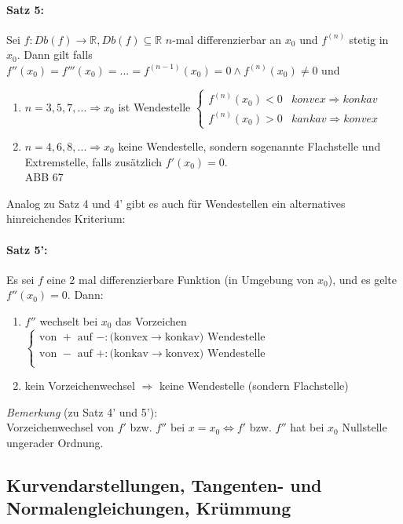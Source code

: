 \paragraph{Satz 5:} Sei $f: Db(f) \to \mathbb{R}, Db(f) \subseteq \mathbb{R}$ $n$-mal differenzierbar an $x_0$ und $f^{(n)}$ stetig in $x_0$. Dann gilt falls $f''(x_0)=f'''(x_0)=...=f^{(n-1)}(x_0)=0 \wedge f^{(n)}(x_0)\not = 0$ und
\begin{enumerate}[label=\alph*.)]
\item $n=3,5,7,... \Rightarrow x_0$ ist Wendestelle $\begin{cases}
f^{(n)}(x_0)<0 & konvex \Rightarrow konkav\\
f^{(n)}(x_0)>0 & kankav \Rightarrow konvex
\end{cases}$
\item $n=4,6,8,... \Rightarrow x_0$ keine Wendestelle, sondern sogenannte Flachstelle und Extremstelle, falls zusätzlich $f'(x_0) = 0$.\\
ABB 67
\end{enumerate}
Analog zu Satz 4 und 4' gibt es auch für Wendestellen ein alternatives hinreichendes Kriterium:
\paragraph{Satz 5':} Es sei $f$ eine 2 mal differenzierbare Funktion (in Umgebung von $x_0$), und es gelte $f''(x_0)=0$. Dann:
\begin{enumerate}[label=\alph*.)]
\item $f''$ wechselt bei $x_0$ das Vorzeichen $\begin{cases}
\text{von } + \text{ auf } -: \text{(konvex}\to \text{konkav) Wendestelle}\\
\text{von } - \text{ auf } +: \text{(konkav}\to \text{konvex) Wendestelle}\\
\end{cases}$
\item kein Vorzeichenwechsel $\Rightarrow$ keine Wendestelle (sondern Flachstelle)
\end{enumerate}
\emph{Bemerkung} (zu Satz 4' und 5'):\\
Vorzeichenwechsel von $f'$ bzw. $f''$ bei $x=x_0 \Leftrightarrow f'$ bzw. $f''$ hat bei $x_0$ Nullstelle ungerader Ordnung.

\subsection[Kurvendarstellungen]{Kurvendarstellungen, Tangenten- und Normalengleichungen, Krümmung}
